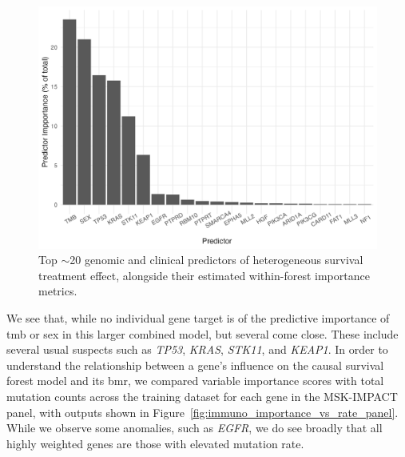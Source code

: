 \documentclass[../thesis.tex]{subfiles}
\begin{document}
\begin{figure}[!tpb] 
\centering
\includegraphics[width=\textwidth]{figures/chapter4/immuno_panel_variable_importance.png}
\caption{Top $\sim$20 genomic and clinical predictors of heterogeneous survival treatment effect, alongside their estimated within-forest importance metrics.  \label{fig:immuno_panel_variable_importance}}
\end{figure}

We see that, while no individual gene target is of the predictive importance of \gls{tmb} or sex in this larger combined model, but several come close. These include several usual suspects such as \emph{TP53}, \emph{KRAS}, \emph{STK11}, and \emph{KEAP1}. In order to understand the relationship between a gene's influence on the causal survival forest model and its \gls{bmr}, we compared variable importance scores with total mutation counts across the training dataset for each gene in the MSK-IMPACT panel, with outputs shown in Figure~\ref{fig:immuno_importance_vs_rate_panel}. While we observe some anomalies, such as \emph{EGFR}, we do see broadly that all highly weighted genes are those with elevated mutation rate.
\end{document}
